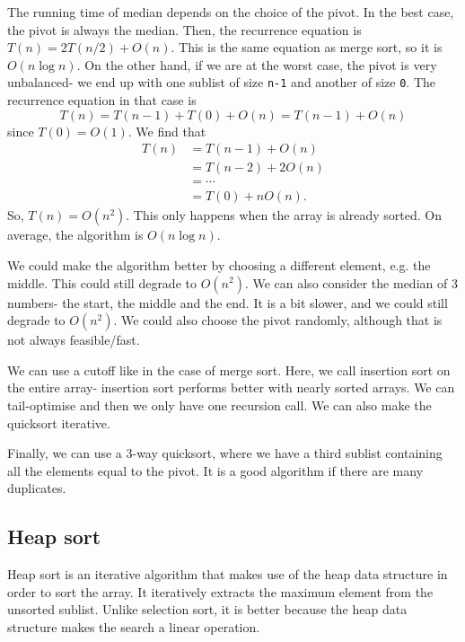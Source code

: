 \documentclass[a4paper, openany]{memoir}
\begin{document}
\noindent The running time of median depends on the choice of the pivot. In the best case, the pivot is always the median. Then, the recurrence equation is $T(n) = 2T(n/2) + O(n)$. This is the same equation as merge sort, so it is $O(n \log n)$. On the other hand, if we are at the worst case, the pivot is very unbalanced- we end up with one sublist of size \texttt{n-1} and another of size \texttt{0}. The recurrence equation in that case is
\[T(n) = T(n-1) + T(0) + O(n) = T(n-1) + O(n)\]
since $T(0) = O(1)$. We find that
\begin{align*}
    T(n) &= T(n-1) + O(n) \\
    &= T(n-2) + 2O(n) \\
    &= \cdots \\
    &= T(0) + nO(n).
\end{align*}
So, $T(n) = O(n^2)$. This only happens when the array is already sorted. On average, the algorithm is $O(n \log n)$.

\noindent We could make the algorithm better by choosing a different element, e.g. the middle. This could still degrade to $O(n^2)$. We can also consider the median of 3 numbers- the start, the middle and the end. It is a bit slower, and we could still degrade to $O(n^2)$. We could also choose the pivot randomly, although that is not always feasible/fast.

\noindent We can use a cutoff like in the case of merge sort. Here, we call insertion sort on the entire array- insertion sort performs better with nearly sorted arrays. We can tail-optimise and then we only have one recursion call. We can also make the quicksort iterative.

\noindent Finally, we can use a 3-way quicksort, where we have a third sublist containing all the elements equal to the pivot. It is a good algorithm if there are many duplicates.

\subsection{Heap sort}
Heap sort is an iterative algorithm that makes use of the heap data structure in order to sort the array. It iteratively extracts the maximum element from the unsorted sublist. Unlike selection sort, it is better because the heap data structure makes the search a linear operation. 
\end{document}
